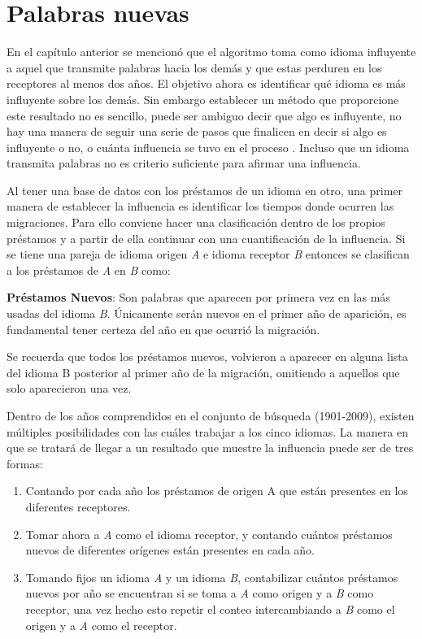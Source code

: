 \chapter{Palabras nuevas}
En el capítulo anterior se mencionó que el algoritmo toma como  idioma
influyente a aquel que transmite palabras hacia los demás y que estas perduren
en los receptores al menos dos años.   El objetivo ahora es identificar qué
idioma es más influyente sobre los demás. Sin embargo establecer un método que
proporcione este resultado no es sencillo,  puede ser ambiguo decir que algo es
influyente, no hay una manera de seguir una serie de pasos que finalicen en
decir si algo es influyente o no,  o cuánta influencia se tuvo en el proceso
.
Incluso que un idioma transmita palabras no es criterio suficiente para afirmar
una influencia.  

Al tener una base de datos  con los préstamos de un idioma en otro,  una primer
manera de establecer la influencia es  identificar los tiempos donde ocurren
las migraciones.  Para ello conviene hacer una clasificación dentro de los
propios préstamos y a partir de ella  continuar con una cuantificación de la
influencia.  Si se tiene una pareja de idioma origen \textit{A} e idioma
receptor \textit{B} entonces se clasifican a los préstamos de \textit{A} en
\textit{B} como:

\textbf{Préstamos Nuevos}: Son palabras que aparecen por primera vez en las más
usadas del idioma \textit{B}.  Únicamente serán nuevos en el primer año de
aparición,  es fundamental tener certeza del año en que ocurrió la migración. 

Se recuerda que todos los préstamos nuevos, volvieron a aparecer en alguna
lista del idioma B posterior al primer año de la migración, omitiendo a
aquellos que solo aparecieron una vez. 

Dentro de los años comprendidos en el conjunto de búsqueda
(1901-2009), existen múltiples posibilidades con las cuáles trabajar a los
cinco idiomas. La manera en que se tratará de llegar a un resultado que muestre
la influencia puede ser de tres formas:
\begin{enumerate}
\item Contando por cada año los préstamos de origen A que están presentes en
los diferentes receptores.
\item Tomar ahora a \textit{A}  como el idioma receptor, y contando cuántos
préstamos nuevos de diferentes orígenes están presentes en cada año. 
\item Tomando fijos un idioma \textit{A} y un idioma \textit{B},  contabilizar
cuántos préstamos nuevos por año se encuentran si se toma a \textit{A} como
origen y a \textit{B} como receptor,  una vez hecho esto  repetir el conteo
intercambiando a \textit{B} como el origen y a \textit{A} como el receptor. 
\end{enumerate}


